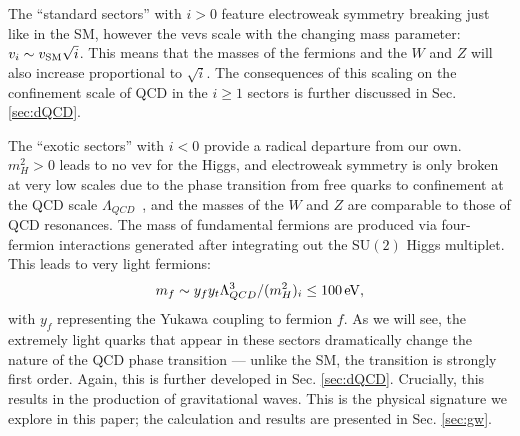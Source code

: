\documentclass[nofootinbib,twocolumn,preprintnumbers]{revtex4-1}
\begin{document}
%
The ``standard sectors'' with $i>0$ feature electroweak symmetry breaking just like in the SM, however the vevs scale with the changing mass parameter: $v_i \sim v_{\rm SM}\sqrt{i}$. This means that the masses of the fermions and the $W$ and $Z$ will also increase proportional to $\sqrt{i}$. The consequences of this scaling on the confinement scale of QCD in the $i \geq 1$ sectors is further discussed in Sec. \ref{sec:dQCD}. 

The ``exotic sectors'' with $i<0$ provide a radical departure from our own. $m_H^2 > 0$ leads to no vev for the Higgs, and electroweak symmetry is only broken at very low scales due to the phase transition from free quarks to confinement at the QCD scale $\Lambda_{QCD}$~\cite{Susskind:1978ms}, and the masses of the $W$ and $Z$ are comparable to those of QCD resonances. The mass of fundamental fermions are produced via four-fermion interactions generated after integrating out the SU$(2)$ Higgs multiplet. This leads to very light fermions: 
\begin{equation}\label{eqn:exoticFM}
m_f \sim y_f y_t \Lambda_{QCD}^3/(m^2_H)_i \leq 100 \,{\rm eV},
\end{equation}
with $y_f$ representing the Yukawa coupling to fermion $f$. As we will see, the extremely light quarks that appear in these sectors dramatically change the nature of the QCD phase transition --- unlike the SM, the transition is strongly first order. Again, this is further developed in Sec. \ref{sec:dQCD}. Crucially, this results in the production of gravitational waves. This is the physical signature we explore in this paper; the calculation and results are presented in Sec. \ref{sec:gw}. 
\end{document}
